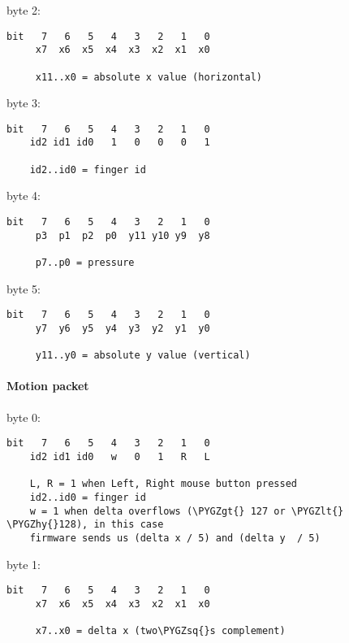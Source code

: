 \documentclass[a4paper,8pt,english]{sphinxmanual}
\def\PYGZlt{\char`\<}
\def\PYGZgt{\char`\>}
\def\PYGZhy{\char`\-}
\def\PYGZsq{\char`\'}
\renewcommand\PYGZsq{\textquotesingle}
\begin{document}
byte 2:

\begin{Verbatim}[commandchars=\\\{\}]
bit   7   6   5   4   3   2   1   0
     x7  x6  x5  x4  x3  x2  x1  x0

     x11..x0 = absolute x value (horizontal)
\end{Verbatim}

byte 3:

\begin{Verbatim}[commandchars=\\\{\}]
bit   7   6   5   4   3   2   1   0
    id2 id1 id0   1   0   0   0   1

    id2..id0 = finger id
\end{Verbatim}

byte 4:

\begin{Verbatim}[commandchars=\\\{\}]
bit   7   6   5   4   3   2   1   0
     p3  p1  p2  p0  y11 y10 y9  y8

     p7..p0 = pressure
\end{Verbatim}

byte 5:

\begin{Verbatim}[commandchars=\\\{\}]
bit   7   6   5   4   3   2   1   0
     y7  y6  y5  y4  y3  y2  y1  y0

     y11..y0 = absolute y value (vertical)
\end{Verbatim}


\paragraph{Motion packet}
\label{input/devices/elantech:motion-packet}
byte 0:

\begin{Verbatim}[commandchars=\\\{\}]
bit   7   6   5   4   3   2   1   0
    id2 id1 id0   w   0   1   R   L

    L, R = 1 when Left, Right mouse button pressed
    id2..id0 = finger id
    w = 1 when delta overflows (\PYGZgt{} 127 or \PYGZlt{} \PYGZhy{}128), in this case
    firmware sends us (delta x / 5) and (delta y  / 5)
\end{Verbatim}

byte 1:

\begin{Verbatim}[commandchars=\\\{\}]
bit   7   6   5   4   3   2   1   0
     x7  x6  x5  x4  x3  x2  x1  x0

     x7..x0 = delta x (two\PYGZsq{}s complement)
\end{Verbatim}
\end{document}
